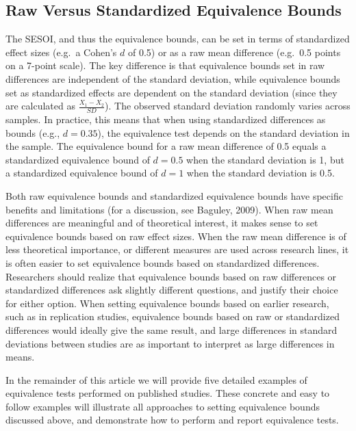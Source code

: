 \documentclass[english,floatsintext,man]{apa6}
\theoremstyle{definition}
\theoremstyle{definition}
\theoremstyle{definition}
\theoremstyle{remark}
\begin{document}
\subsection{Raw Versus Standardized Equivalence
Bounds}\label{raw-versus-standardized-equivalence-bounds}

The SESOI, and thus the equivalence bounds, can be set in terms of
standardized effect sizes (e.g.~a Cohen's \(d\) of 0.5) or as a raw mean
difference (e.g.~0.5 points on a 7-point scale). The key difference is
that equivalence bounds set in raw differences are independent of the
standard deviation, while equivalence bounds set as standardized effects
are dependent on the standard deviation (since they are calculated as
\(\frac {X _ { 1} - X _ { 2} } {S D}\)). The observed standard deviation
randomly varies across samples. In practice, this means that when using
standardized differences as bounds (e.g., \(d = 0.35\)), the equivalence
test depends on the standard deviation in the sample. The equivalence
bound for a raw mean difference of 0.5 equals a standardized equivalence
bound of \(d = 0.5\) when the standard deviation is 1, but a
standardized equivalence bound of \(d = 1\) when the standard deviation
is 0.5.

Both raw equivalence bounds and standardized equivalence bounds have
specific benefits and limitations (for a discussion, see Baguley, 2009).
When raw mean differences are meaningful and of theoretical interest, it
makes sense to set equivalence bounds based on raw effect sizes. When
the raw mean difference is of less theoretical importance, or different
measures are used across research lines, it is often easier to set
equivalence bounds based on standardized differences. Researchers should
realize that equivalence bounds based on raw differences or standardized
differences ask slightly different questions, and justify their choice
for either option. When setting equivalence bounds based on earlier
research, such as in replication studies, equivalence bounds based on
raw or standardized differences would ideally give the same result, and
large differences in standard deviations between studies are as
important to interpret as large differences in means.

In the remainder of this article we will provide five detailed examples
of equivalence tests performed on published studies. These concrete and
easy to follow examples will illustrate all approaches to setting
equivalence bounds discussed above, and demonstrate how to perform and
report equivalence tests.
\end{document}
